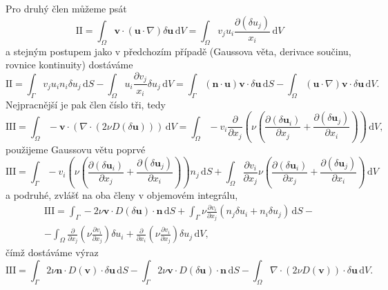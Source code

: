 Pro druhý člen můžeme psát
\begin{equation*}
\mathrm{II}
=
\int_{\Omega} 
\mathbf{v}\cdot(\mathbf{u}\cdot \nabla)\delta\mathbf{u}
\, \mathrm{d}V
=
\int_{\Omega} 
v_j  u_i \frac{\partial (\delta u_j)}{x_i}
\, \mathrm{d}V
\end{equation*}
a stejným postupem jako v předchozím případě (Gaussova věta, derivace součinu, rovnice kontinuity) dostáváme
\begin{equation}\label{eq:clen_II}
\mathrm{II}
=
\int_{\Gamma} 
v_j u_i n_i \delta u_j  
\, \mathrm{d}S
-
\int_{\Omega} 
u_i \frac{\partial v_j  }{x_i} \delta u_j
\, \mathrm{d}V
=
\int_{\Gamma} 
(\mathbf{n} \cdot \mathbf{u}) \mathbf{v}\cdot \delta \mathbf{u} 
\, \mathrm{d}S
-
\int_{\Omega} 
(\mathbf{u} \cdot \nabla)\mathbf{v}\cdot \delta \mathbf{u}
\, \mathrm{d}V.
\end{equation}
Nejpracnější je pak člen číslo tři, tedy
\begin{equation*}
\mathrm{III}
=
\int_{\Omega} 
-\mathbf{v}\cdot \left(\nabla \cdot (2\nu D(\delta \mathbf{u}) )\right)
\, \mathrm{d}V
=
\int_{\Omega} 
- v_i \frac{\partial}{\partial x_j} \left(  \nu
\left(\frac{\partial (\delta \mathbf{u}_i)}{\partial x_j} + 
\frac{\partial (\delta \mathbf{u}_j)}{\partial x_i}\right)
\right)
\, \mathrm{d}V,
\end{equation*}
použijeme Gaussovu větu poprvé
\begin{equation*}
\mathrm{III}
=
\int_{\Gamma} 
- v_i \left(  \nu
\left(\frac{\partial (\delta \mathbf{u}_i)}{\partial x_j} + 
\frac{\partial (\delta \mathbf{u}_j)}{\partial x_i}\right)
\right) n_j
\, \mathrm{d}S
+
\int_{\Omega} 
\frac{\partial v_i}{\partial x_j}   \nu
\left(\frac{\partial (\delta \mathbf{u}_i)}{\partial x_j} + 
\frac{\partial (\delta \mathbf{u}_j)}{\partial x_i}\right)
\, \mathrm{d}V
\end{equation*}
a podruhé, zvlášť na oba členy v objemovém integrálu,
\begin{multline*}
\mathrm{III}
=
\int_{\Gamma} 
- 2\nu \mathbf{v} \cdot  D(\delta \mathbf{u})\cdot \mathbf{n}
\, \mathrm{d}S
+
\int_{\Gamma} 
\nu \frac{\partial v_i}{\partial x_j}
(n_j \delta u_i + n_i \delta u_j)
\, \mathrm{d}S
-\\-
\int_{\Omega} 
\frac{\partial}{\partial x_j}\left( \nu \frac{\partial v_i}{\partial x_j} \right) \delta u_i + \frac{\partial}{\partial x_i}\left( \nu \frac{\partial v_i}{\partial x_j} \right) \delta u_j
\, \mathrm{d}V,
\end{multline*}
čímž dostáváme výraz
\begin{equation}\label{eq:clen_III}
\mathrm{III}
=
\int_{\Gamma} 
2\nu \mathbf{n} \cdot  D(\mathbf{v})\cdot \delta \mathbf{u}
\, \mathrm{d}S
- \int_{\Gamma} 
2\nu \mathbf{v} \cdot  D(\delta \mathbf{u})\cdot \mathbf{n}
\, \mathrm{d}S
-
\int_{\Omega} 
\nabla \cdot \left( 2\nu D(\mathbf{v}) \right) \cdot \delta \mathbf{u}
\, \mathrm{d}V.
\end{equation}
